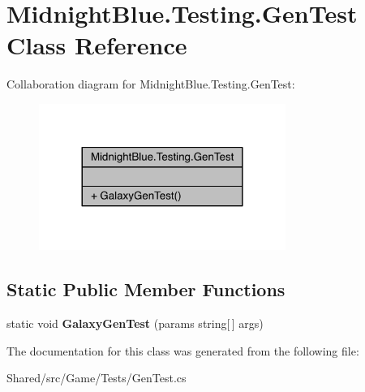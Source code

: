 \hypertarget{class_midnight_blue_1_1_testing_1_1_gen_test}{}\section{Midnight\+Blue.\+Testing.\+Gen\+Test Class Reference}
\label{class_midnight_blue_1_1_testing_1_1_gen_test}


Collaboration diagram for Midnight\+Blue.\+Testing.\+Gen\+Test\+:\nopagebreak
\begin{figure}[H]
\begin{center}
\leavevmode
\includegraphics[width=228pt]{class_midnight_blue_1_1_testing_1_1_gen_test__coll__graph}
\end{center}
\end{figure}
\subsection*{Static Public Member Functions}
\begin{DoxyCompactItemize}
\item 
\hypertarget{class_midnight_blue_1_1_testing_1_1_gen_test_a9e196f4e8e4336758ed2c2099ace6d58}{}\label{class_midnight_blue_1_1_testing_1_1_gen_test_a9e196f4e8e4336758ed2c2099ace6d58} 
static void {\bfseries Galaxy\+Gen\+Test} (params string\mbox{[}$\,$\mbox{]} args)
\end{DoxyCompactItemize}


The documentation for this class was generated from the following file\+:\begin{DoxyCompactItemize}
\item 
Shared/src/\+Game/\+Tests/Gen\+Test.\+cs\end{DoxyCompactItemize}
